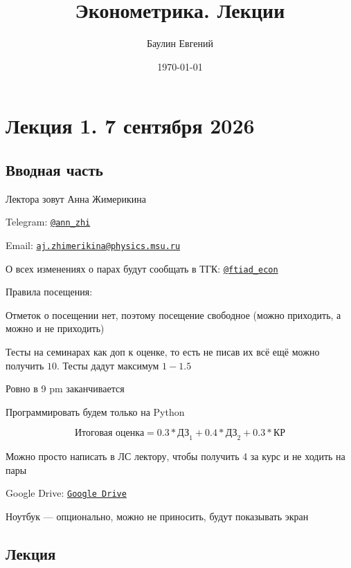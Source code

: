 \documentclass[12pt,a4paper]{article}
\title{Эконометрика. Лекции}
\author{Баулин Евгений}
\date{\today}
\numberwithin{equation}{section}
\theoremstyle{plain}
\theoremstyle{definition}
\theoremstyle{remark}
\begin{document}

\maketitle
\tableofcontents
\clearpage

\section{Лекция 1. 7 сентября 2026}

\subsection{Вводная часть}

Лектора зовут Анна Жимерикина

Telegram: \href{https://t.me/ann_zhi}{\texttt{@ann\_zhi}}

Email: \href{mailto:aj.zhimerikina@physics.msu.ru}{\nolinkurl{aj.zhimerikina@physics.msu.ru}}

О всех изменениях о парах будут сообщать в ТГК: \href{https://t.me/ftiad_econ}{\texttt{@ftiad\_econ}}

Правила посещения:

Отметок о посещении нет, поэтому посещение свободное (можно приходить, а можно и не приходить)

Тесты на семинарах как доп к оценке, то есть не писав их всё ещё можно получить $10$. Тесты дадут максимум $1-1.5$

Ровно в 9 pm заканчивается

Программировать будем только на Python

$$
    \text{Итоговая оценка} = 0.3 * \text{ДЗ}_1 + 0.4 * \text{ДЗ}_2 + 0.3 * \text{КР}
$$

Можно просто написать в ЛС лектору, чтобы получить 4 за курс и не ходить на пары

Google Drive: \href{https://drive.google.com/drive/folders/1e8s9vTZWyk2HHJh6tHfEJ-FtTs13sTG0}{\texttt{Google Drive}}

Ноутбук — опционально, можно не приносить, будут показывать экран

\subsection{Лекция}
\end{document}
